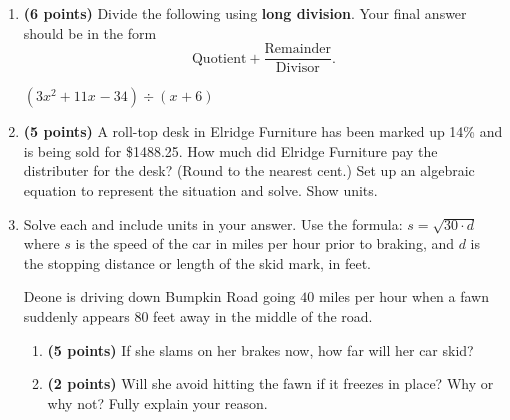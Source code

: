 \documentclass[12pt]{amsart}
\begin{document}
\begin{enumerate}
  
\vfill \vfill \vfill
\def \a{6}\def \b{3}\def \c{-7}\def \r{8}\def \monicpol{x^{}+6}\def \longnbad{3x^{2}+11x^{}-34}\def \anspol{3x^{}-7}
\item {\bf (6 points)} 
 Divide the following using {\bf long division}. Your final answer should be in the form $$ \text{Quotient} + \dfrac{\text{Remainder}}{\text{Divisor}}.$$

\vspace{3mm}

$(\longnbad) \div (\monicpol)$

\vfill  \vfill \vfill
\newpage\def \discount{14}\def \paid{1488.25}\def \rainy{14.32}\def \orcost{1730.52}\def \purcost{1305.48}\def \orrainy{16.65}
\item {\bf (5 points)} 
 A roll-top desk in Elridge Furniture has been marked up \discount\% and is being sold for \$\paid. How much did Elridge Furniture pay the distributer for the desk? (Round to the nearest cent.) Set up an algebraic equation to represent the situation and solve. Show units.

\vfill 
\def \insvar{30}\def \d{80}\def \zerospeed{48.99}\def \slimit{40}\def \s{59}\def \skidd{116.033}\def \safed{53.333}\def \rsafed{53}

 
\item Solve each and include units in your answer. Use the formula: $s = \sqrt{\insvar \cdot d}$ where $s$ is the speed of the car in miles per hour prior to braking, and $d$ is the stopping distance or length of the skid mark, in feet. 

\vspace{3mm}

Deone is driving down Bumpkin Road going $\slimit$ miles per hour when a fawn suddenly appears $\d$ feet away in the middle of the road. \begin{enumerate}
\item {\bf (5 points)} If she slams on her brakes now, how far will her car skid? \vspace{4cm}
\item {\bf (2 points)} Will she avoid hitting the fawn if it freezes in place? Why or why not? Fully explain your reason. \vspace{3cm}
\end{enumerate}



\end{enumerate}
\end{document}

